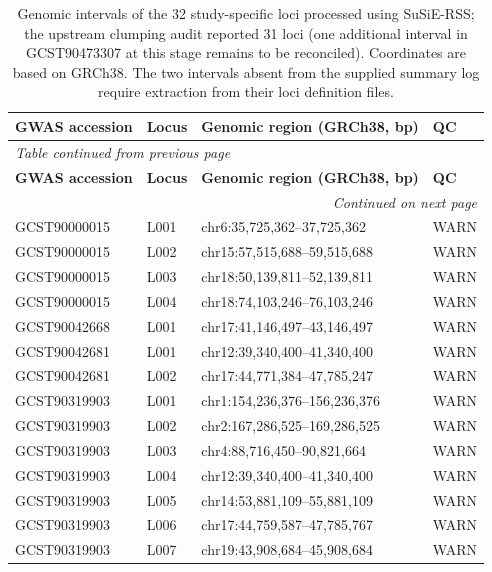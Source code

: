 \documentclass[11pt,a4paper]{article}
\begin{document}
\begin{longtable}{@{}llp{7.0cm}l@{}}

\caption{
Genomic intervals of the 32 study-specific loci
processed using SuSiE-RSS; the upstream clumping audit
reported 31 loci (one additional interval in
GCST90473307 at this stage remains to be reconciled).
Coordinates are based on GRCh38.
The two intervals absent from the supplied summary log
require extraction from their loci definition files.
}
\label{tab:finemapping_regions}\\

\toprule
\textbf{GWAS accession} &
\textbf{Locus} &
\textbf{Genomic region (GRCh38, bp)} &
\textbf{QC} \\
\midrule
\endfirsthead

\multicolumn{4}{l}{
\textit{Table continued from previous page}
}\\
\toprule
\textbf{GWAS accession} &
\textbf{Locus} &
\textbf{Genomic region (GRCh38, bp)} &
\textbf{QC} \\
\midrule
\endhead

\midrule
\multicolumn{4}{r}{\textit{Continued on next page}}\\
\endfoot

\bottomrule
\endlastfoot

GCST90000015 & L001 &
chr6:35,725,362--37,725,362 & WARN \\
GCST90000015 & L002 &
chr15:57,515,688--59,515,688 & WARN \\
GCST90000015 & L003 &
chr18:50,139,811--52,139,811 & WARN \\
GCST90000015 & L004 &
chr18:74,103,246--76,103,246 & WARN \\

\midrule

GCST90042668 & L001 &
chr17:41,146,497--43,146,497 & WARN \\

\midrule

GCST90042681 & L001 &
chr12:39,340,400--41,340,400 & WARN \\
GCST90042681 & L002 &
chr17:44,771,384--47,785,247 & WARN \\

\midrule

GCST90319903 & L001 &
chr1:154,236,376--156,236,376 & WARN \\
GCST90319903 & L002 &
chr2:167,286,525--169,286,525 & WARN \\
GCST90319903 & L003 &
chr4:88,716,450--90,821,664 & WARN \\
GCST90319903 & L004 &
chr12:39,340,400--41,340,400 & WARN \\
GCST90319903 & L005 &
chr14:53,881,109--55,881,109 & WARN \\
GCST90319903 & L006 &
chr17:44,759,587--47,785,767 & WARN \\
GCST90319903 & L007 &
chr19:43,908,684--45,908,684 & WARN \\


\end{longtable}
\end{document}
